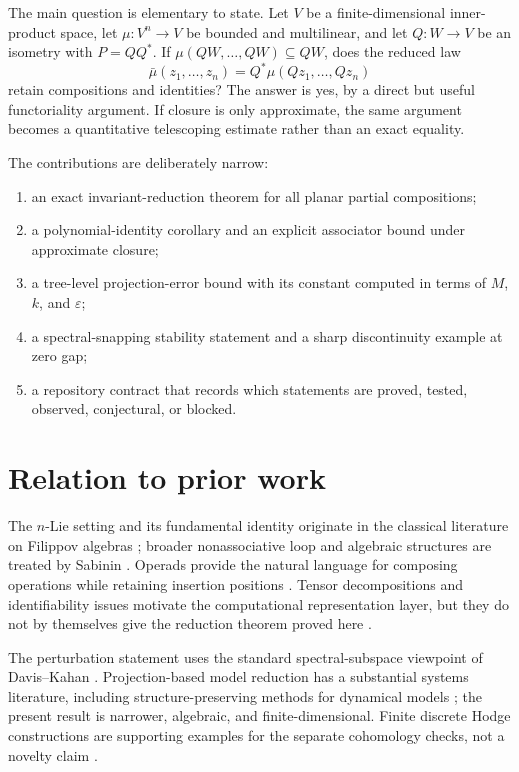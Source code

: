 \documentclass[11pt]{article}
\begin{document}
The main question is elementary to state. Let $V$ be a finite-dimensional inner-product space, let $\mu:V^n\to V$ be bounded and multilinear, and let $Q:W\to V$ be an isometry with $P=QQ^*$. If $\mu(QW,\ldots,QW)\subseteq QW$, does the reduced law
\[
    \bar\mu(z_1,\ldots,z_n)=Q^*\mu(Qz_1,\ldots,Qz_n)
\]
retain compositions and identities? The answer is yes, by a direct but useful functoriality argument. If closure is only approximate, the same argument becomes a quantitative telescoping estimate rather than an exact equality.

The contributions are deliberately narrow:
\begin{enumerate}
    \item an exact invariant-reduction theorem for all planar partial compositions;
    \item a polynomial-identity corollary and an explicit associator bound under approximate closure;
    \item a tree-level projection-error bound with its constant computed in terms of $M$, $k$, and $\varepsilon$;
    \item a spectral-snapping stability statement and a sharp discontinuity example at zero gap;
    \item a repository contract that records which statements are proved, tested, observed, conjectural, or blocked.
\end{enumerate}

\section{Relation to prior work}

The $n$-Lie setting and its fundamental identity originate in the classical literature on Filippov algebras \cite{Filippov1985}; broader nonassociative loop and algebraic structures are treated by Sabinin \cite{Sabinin1999}. Operads provide the natural language for composing operations while retaining insertion positions \cite{LodayVallette2012}. Tensor decompositions and identifiability issues motivate the computational representation layer, but they do not by themselves give the reduction theorem proved here \cite{KoldaBader2009,Kruskal1977}.

The perturbation statement uses the standard spectral-subspace viewpoint of Davis--Kahan \cite{DavisKahan1970}. Projection-based model reduction has a substantial systems literature, including structure-preserving methods for dynamical models \cite{BennerGugercinWillcox2015,ChaturantabutBeattieGugercin2016}; the present result is narrower, algebraic, and finite-dimensional. Finite discrete Hodge constructions are supporting examples for the separate cohomology checks, not a novelty claim \cite{Dodziuk1976}.
\end{document}
